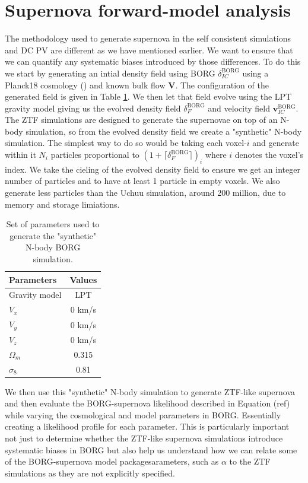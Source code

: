 \section{Supernova forward-model analysis}

The methodology used to generate supernova in the self consistent simulations and DC PV are different as we have mentioned earlier. We want to ensure that we can 
quantify any systematic biases introduced by those differences. To do this we start by generating an intial density field using BORG $\delta^{\text{BORG}}_{IC}$ using a 
Planck18 cosmology (\cite{Planck_2018_params}) and known bulk flow $\mathbf{V}$. The configuration of the generated field is given in Table \ref{tab:borg_nbody}. 
We then let that field evolve using the LPT gravity model giving us the evolved density field 
$\delta^{\text{BORG}}_{F}$ and velocity field $\mathbf{v}^{\text{BORG}}_{IC}$. The ZTF simulations are designed to generate the supernovae on top of an N-body simulation, so 
from the evolved density field we create a "synthetic" N-body simulation. The simplest way to do so would be taking each voxel-$i$ and generate within it $N_i$ particles proportional 
to $(1+\lceil \delta^{\text{BORG}}_{F}\rceil )_i$ where $i$ denotes the voxel's index. We take the cieling of the evolved density field to ensure we get an integer number of 
particles and to have at least 1 particle in empty voxels. We also generate less particles than the Uchuu simulation, around 200 million, due to memory and storage limiations. \\

\begin{table}[ht]
    \centering
    \caption{Set of parameters used to generate the "synthetic" N-body BORG simulation.}
    \label{tab:borg_nbody}
    \begin{tabular}{|l|c|}
        \hline
        Parameters & Values \\
        \hline
        Gravity model & LPT \\
        $V_x$ & 0 km/s \\
        $V_y$ & 0 km/s \\
        $V_z$ & 0 km/s \\
        $\Omega_m$ & 0.315 \\
        $\sigma_8$ & 0.81 \\
        \hline
    \end{tabular}
\end{table}
We then use this "synthetic" N-body simulation to generate ZTF-like supernova and then evaluate the BORG-supernova likelihood described in Equation (ref) 
while varying the cosmological and model parameters in BORG. Essentially creating a likelihood profile for each parameter. This is particularly important not just to 
determine whether the ZTF-like supernova simulations introduce systematic biases in BORG but also help us understand how we can relate some of the BORG-supernova model packagesarameters, 
such as $\alpha$ to the ZTF simulations as they are not explicitly specified. \\

